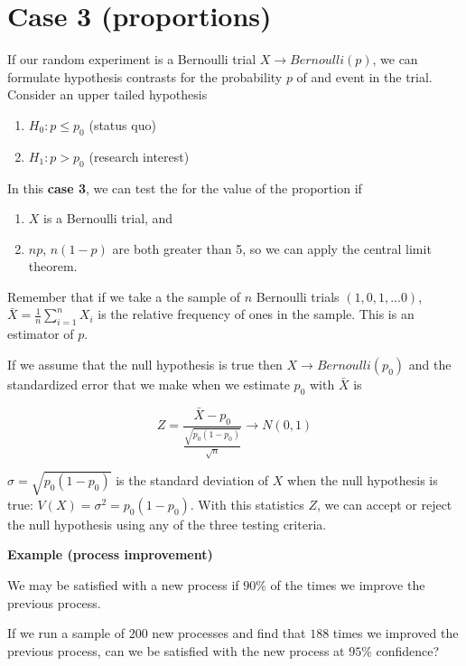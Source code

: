 \documentclass[
]{book}
\providecommand{\tightlist}{%
  \setlength{\itemsep}{0pt}\setlength{\parskip}{0pt}}
\begin{document}
\hypertarget{case-3-proportions-1}{%
\section{Case 3 (proportions)}\label{case-3-proportions-1}}

If our random experiment is a Bernoulli trial \(X \rightarrow Bernoulli(p)\), we can formulate hypothesis contrasts for the probability \(p\) of and event in the trial. Consider an upper tailed hypothesis

\begin{enumerate}
\def\labelenumi{\alph{enumi}.}
\tightlist
\item
  \(H_0: p \leq p_0\) (status quo)
\item
  \(H_1: p> p_0\) (research interest)
\end{enumerate}

In this \textbf{case 3}, we can test the for the value of the proportion if

\begin{enumerate}
\def\labelenumi{\arabic{enumi}.}
\tightlist
\item
  \(X\) is a Bernoulli trial, and
\item
  \(np\), \(n(1-p)\) are both greater than 5, so we can apply the central limit theorem.
\end{enumerate}

Remember that if we take a the sample of \(n\) Bernoulli trials \((1,0,1,...0)\), \(\bar{X}=\frac{1}{n}\sum_{i=1}^n X_i\) is the relative frequency of ones in the sample. This is an estimator of \(p\).

If we assume that the null hypothesis is true then \(X \rightarrow Bernoulli(p_0)\) and the standardized error that we make when we estimate \(p_0\) with \(\bar{X}\) is

\[Z=\frac{\bar{X}-p_0}{\frac{\sqrt{p_0(1-p_0)}}{\sqrt{n}}}  \rightarrow N(0,1)\]

\(\sigma=\sqrt{p_0(1-p_0)}\) is the standard deviation of \(X\) when the null hypothesis is true: \(V(X)=\sigma^2=p_0(1-p_0)\). With this statistics \(Z\), we can accept or reject the null hypothesis using any of the three testing criteria.

\textbf{Example (process improvement)}

We may be satisfied with a new process if \(90\%\) of the times we improve the previous process.

If we run a sample of \(200\) new processes and find that \(188\) times we improved the previous process, can we be satisfied with the new process at \(95\%\) confidence?
\end{document}
